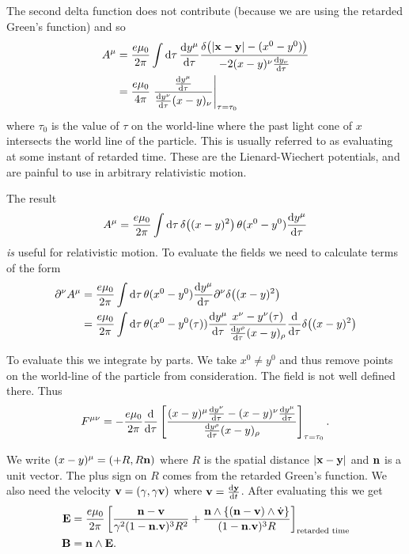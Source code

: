 \documentclass{notes}
\newcommand{\B}{\vect{B}}
\newcommand{\E}{\vect{E}}
\begin{document}
The second delta function does not contribute (because we are using the
retarded Green's function) and so
\begin{align*}
A^\mu &= \frac{e \mu_0}{2 \pi} \int \mathrm{d} \tau\, \frac{\mathrm{d} y^\mu}{\mathrm{d}\tau}
\frac{\delta\!\left(\left|\mathbf{x} - \mathbf{y}\right|
- (x^0 - y^0) \right)}{-2 (x-y)^\nu \frac{\mathrm{d} y_\nu}{\mathrm{d}\tau}} \\
&= \frac{e \mu_0}{4 \pi} \left. \frac{\frac{\mathrm{d} y^\mu}{\mathrm{d}\tau}}{\frac{\mathrm{d} y^\nu}{\mathrm{d}\tau}
(x-y)_\nu}\right|_{\tau = \tau_0}
\end{align*}
where $\tau_0$ is the value of $\tau$ on the world-line where the past light
cone of $x$ intersects the world line of the particle.  This is usually
referred to as evaluating at some instant of retarded time.
These are the Lienard-Wiechert potentials, and are painful to use in
arbitrary relativistic motion.

The result
\[
A^\mu = \frac{e \mu_0}{2 \pi} \int \mathrm{d} \tau \,
\delta\!\left((x-y)^2\right) \theta(x^0 - y^0) \frac{\mathrm{d} y^\mu}{\mathrm{d}\tau}
\]
\emph{is} useful for relativistic motion.  To evaluate the fields we
need to calculate terms of the form
\begin{align*}
\partial^\nu A^\mu &= \frac{e \mu_0}{2 \pi}
\int \mathrm{d} \tau\, \theta(x^0 - y^0) \frac{\mathrm{d} y^\mu}{\mathrm{d}\tau} \partial^\nu
\delta\!\left( (x-y)^2 \right) \\
&= \frac{e \mu_0}{2 \pi} \int \mathrm{d} \tau\,
\theta(x^0 - y^0(\tau)) \frac{\mathrm{d} y^\mu}{\mathrm{d}\tau} \frac{x^\nu - y^\nu(\tau)}
{\frac{\mathrm{d} y^\rho}{\mathrm{d}\tau} (x-y)_\rho} \frac{\mathrm{d}}{\mathrm{d}\tau} \delta\!\left( (x-y)^2 \right)
\end{align*}

To evaluate this we integrate by parts.  We take $x^0 \neq y^0$ and thus
remove points on the world-line of the particle from consideration.  The
field is not well defined there.  Thus
\[
F^{\mu \nu} = - \frac{e \mu_0}{2 \pi}
\frac{\mathrm{d}}{\mathrm{d}\tau} \left[
\frac{(x-y)^\mu \frac{\mathrm{d} y^\nu}{\mathrm{d}\tau} - (x-y)^\nu \frac{\mathrm{d} y^\mu}{\mathrm{d}\tau}
}{\frac{\mathrm{d} y^\rho}{\mathrm{d}\tau} (x-y)_\rho}
\right]_{\tau = \tau_0}.
\]

We write $(x-y)^\mu = (+R, R\mathbf{n})$ where $R$ is the spatial distance
$\left|\mathbf{x}-\mathbf{y}\right|$ and $\mathbf{n}$ is a unit vector.  The plus
sign on $R$ comes from the retarded Green's function.  We also need
the velocity $\mathbf{v} = (\gamma,\gamma \mathbf{v})$ where $\mathbf{v}
= \frac{\mathrm{d}\mathbf{y}}{\mathrm{d} t}$.  After evaluating this we get
\begin{align*}
\E &= \frac{e \mu_0}{2 \pi} \left[
\frac{\vect{n} - \vect{v}}{\gamma^2 (1-\vect{n}.\vect{v})^3 R^2}
+ \frac{\vect{n} \wedge \left\{(\vect{n} - \vect{v}) \wedge \dot{\vect{v}}
\right\}} {(1-\vect{n}.\vect{v})^3 R}
\right]_{\text{retarded time}} \\
\B &= \vect{n} \wedge \E.
\end{align*}
\end{document}
